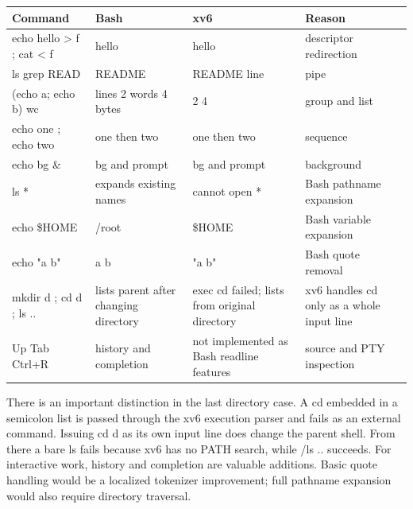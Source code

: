 \documentclass[12pt,a4paper]{article}
\begin{document}
{\def\LTcaptype{table} %
\begin{longtable}[]{@{}
  >{\raggedright\arraybackslash}p{}
  >{\raggedright\arraybackslash}p{}
  >{\raggedright\arraybackslash}p{}
  >{\raggedright\arraybackslash}p{}@{}}
\toprule\noalign{}
\begin{minipage}[b]{\linewidth}\raggedright
\textbf{Command}
\end{minipage} & \begin{minipage}[b]{\linewidth}\raggedright
\textbf{Bash}
\end{minipage} & \begin{minipage}[b]{\linewidth}\raggedright
\textbf{xv6}
\end{minipage} & \begin{minipage}[b]{\linewidth}\raggedright
\textbf{Reason}
\end{minipage} \\
\midrule\noalign{}
\endhead
\bottomrule\noalign{}
\endlastfoot
echo hello \textgreater{} f ; cat \textless{} f & hello & hello &
descriptor redirection \\
ls \textbar{} grep READ & README & README line & pipe \\
(echo a; echo b) \textbar{} wc & 2 lines 2 words 4 bytes & 2 2 4 & group
and list \\
echo one ; echo two & one then two & one then two & sequence \\
echo bg \& & bg and prompt & bg and prompt & background \\
ls * & expands existing names & cannot open * & Bash pathname
expansion \\
echo \$HOME & /root & \$HOME & Bash variable expansion \\
echo "a b" & a b & "a b" & Bash quote removal \\
mkdir d ; cd d ; ls .. & lists parent after changing directory & exec cd
failed; lists from original directory & xv6 handles cd only as a whole
input line \\
Up Tab Ctrl+R & history and completion & not implemented as Bash
readline features & source and PTY inspection \\
\end{longtable}
}

There is an important distinction in the last directory case. A cd
embedded in a semicolon list is passed through the xv6 execution parser
and fails as an external command. Issuing cd d as its own input line
does change the parent shell. From there a bare ls fails because xv6 has
no PATH search, while /ls .. succeeds. For interactive work, history and
completion are valuable additions. Basic quote handling would be a
localized tokenizer improvement; full pathname expansion would also
require directory traversal.
\end{document}

